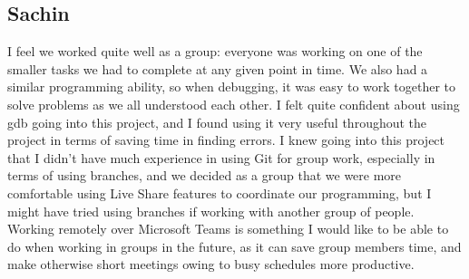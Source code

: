 \documentclass [10pt] {article}
\begin{document}
\subsection*{Sachin}
I feel we worked quite well as a group: everyone was working on one of the smaller tasks we had to complete at any given point in time. We also had a similar programming ability, so when debugging, it was easy to work together to solve problems as we all understood each other. I felt quite confident about using gdb going into this project, and I found using it very useful throughout the project in terms of saving time in finding errors. I knew going into this project that I didn’t have much experience in using Git for group work, especially in terms of using branches, and we decided as a group that we were more comfortable using Live Share features to coordinate our programming, but I might have tried using branches if working with another group of people. Working remotely over Microsoft Teams is something I would like to be able to do when working in groups in the future, as it can save group members time, and make otherwise short meetings owing to busy schedules more productive.
\end{document}

